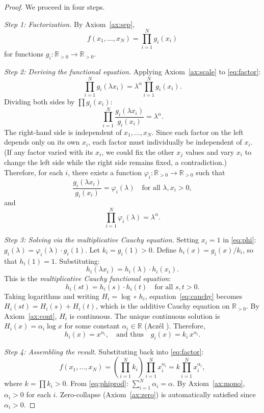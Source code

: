 \documentclass[12pt, a4paper]{article}
\theoremstyle{definition}
\theoremstyle{remark}
\newcommand{\R}{\mathbb{R}}
\newcommand{\Rp}{\mathbb{R}_{>0}}
\begin{document}
\begin{proof}
We proceed in four steps.

\medskip
\noindent\textit{Step 1: Factorization.} By Axiom~\ref{ax:sep},
\begin{equation}\label{eq:factor}
f(x_1, \ldots, x_N) = \prod_{i=1}^{N} g_i(x_i)
\end{equation}
for functions $g_i : \Rp \to \Rp$.

\medskip
\noindent\textit{Step 2: Deriving the functional equation.} Applying Axiom~\ref{ax:scale} to \eqref{eq:factor}:
\[
\prod_{i=1}^{N} g_i(\lambda x_i) = \lambda^\alpha \prod_{i=1}^{N} g_i(x_i).
\]
Dividing both sides by $\prod g_i(x_i)$:
\begin{equation}\label{eq:ratio}
\prod_{i=1}^{N} \frac{g_i(\lambda x_i)}{g_i(x_i)} = \lambda^\alpha.
\end{equation}
The right-hand side is independent of $x_1, \ldots, x_N$. Since each factor on the left depends only on its own $x_i$, each factor must individually be independent of $x_i$. (If any factor varied with its $x_i$, we could fix the other $x_j$ values and vary $x_i$ to change the left side while the right side remains fixed, a contradiction.) Therefore, for each $i$, there exists a function $\varphi_i : \Rp \to \Rp$ such that
\begin{equation}\label{eq:phi}
\frac{g_i(\lambda x_i)}{g_i(x_i)} = \varphi_i(\lambda) \quad \text{for all } \lambda, x_i > 0,
\end{equation}
and
\begin{equation}\label{eq:phiprod}
\prod_{i=1}^{N} \varphi_i(\lambda) = \lambda^\alpha.
\end{equation}

\medskip
\noindent\textit{Step 3: Solving via the multiplicative Cauchy equation.} Setting $x_i = 1$ in \eqref{eq:phi}: $g_i(\lambda) = \varphi_i(\lambda) \cdot g_i(1)$. Let $k_i = g_i(1) > 0$. Define $h_i(x) = g_i(x)/k_i$, so that $h_i(1) = 1$. Substituting:
\[
h_i(\lambda x_i) = h_i(\lambda) \cdot h_i(x_i).
\]
This is the \textit{multiplicative Cauchy functional equation}:
\begin{equation}\label{eq:cauchy}
h_i(st) = h_i(s) \cdot h_i(t) \quad \text{for all } s, t > 0.
\end{equation}
Taking logarithms and writing $H_i = \log \circ \, h_i$, equation~\eqref{eq:cauchy} becomes $H_i(st) = H_i(s) + H_i(t)$, which is the additive Cauchy equation on $\Rp$. By Axiom~\ref{ax:cont}, $H_i$ is continuous. The unique continuous solution is $H_i(x) = \alpha_i \log x$ for some constant $\alpha_i \in \R$ (Acz\'el \cite[Theorem~1, p.~34]{aczel1966}). Therefore,
\[
h_i(x) = x^{\alpha_i}, \quad \text{and thus} \quad g_i(x) = k_i \, x^{\alpha_i}.
\]

\medskip
\noindent\textit{Step 4: Assembling the result.} Substituting back into \eqref{eq:factor}:
\[
f(x_1, \ldots, x_N) = \left(\prod_{i=1}^{N} k_i\right) \prod_{i=1}^{N} x_i^{\alpha_i} = k \prod_{i=1}^{N} x_i^{\alpha_i},
\]
where $k = \prod k_i > 0$. From \eqref{eq:phiprod}: $\sum_{i=1}^{N} \alpha_i = \alpha$. By Axiom~\ref{ax:mono}, $\alpha_i > 0$ for each $i$. Zero-collapse (Axiom~\ref{ax:zero}) is automatically satisfied since $\alpha_i > 0$.
\end{proof}
\end{document}
